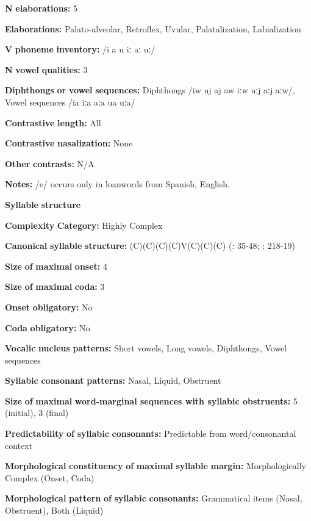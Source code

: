 \textbf{N} \textbf{elaborations:} 5

\textbf{Elaborations:} Palato-alveolar, Retroflex, Uvular, Palatalization, Labialization

\textbf{V} \textbf{phoneme} \textbf{inventory:} /i a u iː aː uː/

\textbf{N} \textbf{vowel} \textbf{qualities:} 3

\textbf{Diphthongs} \textbf{or} \textbf{vowel} \textbf{sequences:} Diphthongs /iw uj aj aw iːw uːj aːj aːw/, Vowel sequences /ia iːa aːa ua uːa/

\textbf{Contrastive} \textbf{length:} All

\textbf{Contrastive} \textbf{nasalization:} None

\textbf{Other} \textbf{contrasts:} N/A

\textbf{Notes:} /e/ occurs only in loanwords from Spanish, English.

\textbf{Syllable} \textbf{structure}

\textbf{Complexity} \textbf{Category:} Highly Complex

\textbf{Canonical} \textbf{syllable} \textbf{structure:} (C)(C)(C)(C)V(C)(C)(C) (\citealt{Crawford1966}: 35-48; \citealt{Bendixen1980}: 218-19)

\textbf{Size} \textbf{of} \textbf{maximal} \textbf{onset:} 4

\textbf{Size} \textbf{of} \textbf{maximal} \textbf{coda:} 3

\textbf{Onset} \textbf{obligatory:} No

\textbf{Coda} \textbf{obligatory:} No

\textbf{Vocalic} \textbf{nucleus} \textbf{patterns:} Short vowels, Long vowels, Diphthongs, Vowel sequences

\textbf{Syllabic} \textbf{consonant} \textbf{patterns:} Nasal, Liquid, Obstruent

\textbf{Size} \textbf{of} \textbf{maximal} \textbf{word{}-marginal sequences with syllabic obstruents:} 5 (initial), 3 (final)

\textbf{Predictability} \textbf{of} \textbf{syllabic} \textbf{consonants:} Predictable from word/consonantal context

\textbf{Morphological} \textbf{constituency} \textbf{of} \textbf{maximal} \textbf{syllable} \textbf{margin:} Morphologically Complex (Onset, Coda)

\textbf{Morphological} \textbf{pattern} \textbf{of} \textbf{syllabic} \textbf{consonants:} Grammatical items (Nasal, Obstruent), Both (Liquid)

